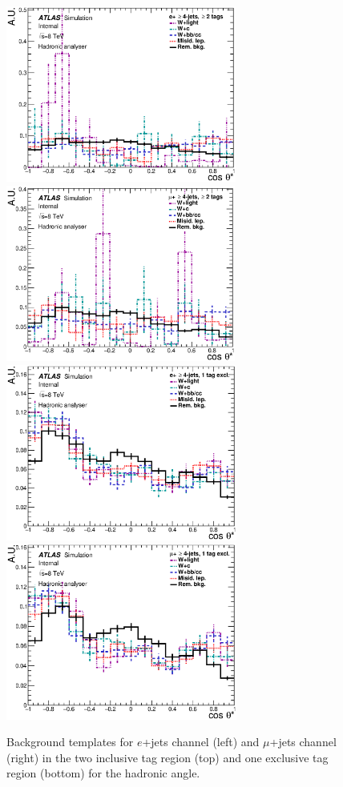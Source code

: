 \begin{figure}[!hb]
  \begin{center}
    \includegraphics[height=58mm]{chapters/whel/figures/templatePlots/Hadronic/Background_Templates_2incl_el_had}
    \includegraphics[height=58mm]{chapters/whel/figures/templatePlots/Hadronic/Background_Templates_2incl_mu_had}\\
    \includegraphics[height=58mm]{chapters/whel/figures/templatePlots/Hadronic/Background_Templates_1excl_el_had}
    \includegraphics[height=58mm]{chapters/whel/figures/templatePlots/Hadronic/Background_Templates_1excl_mu_had}
    \caption{Background templates for $e$+jets channel (left) and $\mu$+jets channel (right) in  the two inclusive \bt tag region (top) and one exclusive \bt tag region (bottom) for the hadronic angle.}
    \label{fig:Bkg_temp_had}
  \end{center}
\end{figure}

